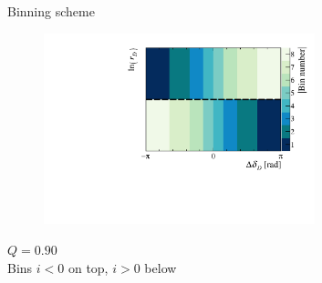 \documentclass[dvipsnames]{beamer}
\begin{document}
\begin{frame}{Binning scheme}
  \begin{figure}
    \centering
    \includegraphics[width = 0.7\textwidth]{Plots/BinningSchemePlot_8Bins.pdf}
  \end{figure}
  \vspace{-1.0cm}
  \begin{center}
    \colorbox{Cerulean!30}{$Q = 0.90$} \\
    Bins $i < 0$ on top, $i > 0$ below
  \end{center}
\end{frame}
\end{document}
